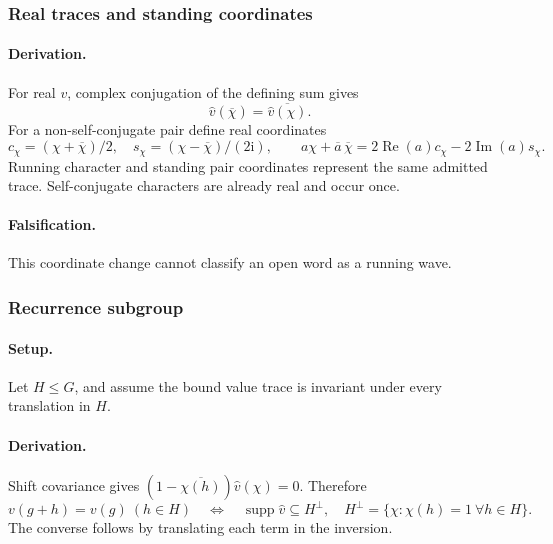 
\subsubsection{Real traces and standing coordinates}
\paragraph{Derivation.}
For real \(v\), complex conjugation of the defining sum gives
\begin{equation}
\widehat v(\overline\chi)=\overline{\widehat v(\chi)}.
\label{eq:fourier-real-symmetry}
\end{equation}
For a non-self-conjugate pair define real coordinates
\begin{equation}
c_\chi=(\chi+\overline\chi)/2,\quad
s_\chi=(\chi-\overline\chi)/(2\mathrm i),\qquad
a\chi+\overline a\,\overline\chi
=2\operatorname{Re}(a)c_\chi-2\operatorname{Im}(a)s_\chi.
\label{eq:fourier-running-standing}
\end{equation}
Running character and standing pair coordinates represent the same admitted
trace. Self-conjugate characters are already real and occur once.
\paragraph{Falsification.} This coordinate change cannot classify an open
word as a running wave.


\subsubsection{Recurrence subgroup}
\paragraph{Setup.}
Let \(H\le G\), and assume the bound value trace is invariant under every
translation in \(H\).
\paragraph{Derivation.} Shift covariance gives
\((1-\overline{\chi(h)})\widehat v(\chi)=0\). Therefore
\begin{equation}
v(g+h)=v(g)\ (h\in H)
\quad\Longleftrightarrow\quad
\operatorname{supp}\widehat v\subseteq H^\perp,
\quad H^\perp=\{\chi:\chi(h)=1\ \forall h\in H\}.
\label{eq:fourier-recurrence-support}
\end{equation}
The converse follows by translating each term in the inversion.

